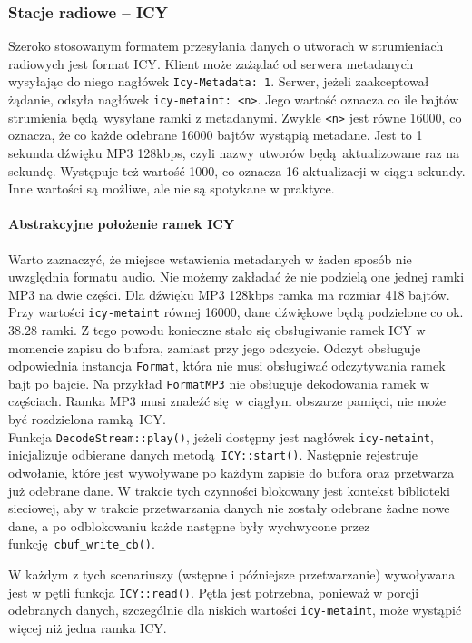 \documentclass[12pt]{report}
\begin{document}
		\subsubsection{Stacje radiowe -- ICY}
			Szeroko stosowanym formatem przesyłania danych o utworach w strumieniach radiowych jest format ICY\textsuperscript{\cite{icy_spec}}. Klient może zażądać od serwera metadanych wysyłając do niego nagłówek \lstinline|Icy-Metadata: 1|. Serwer, jeżeli zaakceptował żądanie, odsyła nagłówek \lstinline|icy-metaint: <n>|. Jego wartość oznacza co ile bajtów strumienia będą wysyłane ramki z metadanymi. Zwykle \lstinline|<n>| jest równe 16000, co oznacza, że co każde odebrane 16000 bajtów wystąpią metadane. Jest to 1 sekunda dźwięku MP3 128kbps, czyli nazwy utworów będą aktualizowane raz na sekundę. Występuje też wartość 1000, co oznacza 16 aktualizacji w ciągu sekundy. Inne wartości są możliwe, ale nie są spotykane w praktyce.
			
			\paragraph{Abstrakcyjne położenie ramek ICY}
				Warto zaznaczyć, że miejsce wstawienia metadanych w żaden sposób nie uwzględnia formatu audio. Nie możemy zakładać że nie podzielą one jednej ramki MP3 na dwie części. Dla dźwięku MP3 128kbps ramka ma rozmiar 418 bajtów. Przy wartości \lstinline|icy-metaint| równej 16000, dane dźwiękowe będą podzielone co ok. $38.28$ ramki. Z tego powodu konieczne stało się obsługiwanie ramek ICY w momencie zapisu do bufora, zamiast przy jego odczycie. Odczyt obsługuje odpowiednia instancja \lstinline|Format|, która nie musi obsługiwać odczytywania ramek bajt po bajcie. Na przykład \lstinline|FormatMP3| nie obsługuje dekodowania ramek w częściach. Ramka MP3 musi znaleźć się w ciągłym obszarze pamięci, nie może być rozdzielona ramką ICY.
			$ $\\
			
			Funkcja \lstinline|DecodeStream::play()|, jeżeli dostępny jest nagłówek \lstinline|icy-metaint|, inicjalizuje odbierane danych metodą \lstinline|ICY::start()|. Następnie rejestruje odwołanie, które jest wywoływane po każdym zapisie do bufora oraz przetwarza już odebrane dane. W trakcie tych czynności blokowany jest kontekst biblioteki sieciowej, aby w trakcie przetwarzania danych nie zostały odebrane żadne nowe dane, a po odblokowaniu każde następne były wychwycone przez funkcję \lstinline|cbuf_write_cb()|.
			
			W każdym z tych scenariuszy (wstępne i późniejsze przetwarzanie) wywoływana jest w pętli funkcja \lstinline|ICY::read()|. Pętla jest potrzebna, ponieważ w porcji odebranych danych, szczególnie dla niskich wartości \lstinline|icy-metaint|, może wystąpić więcej niż jedna ramka ICY.
			
\end{document}
